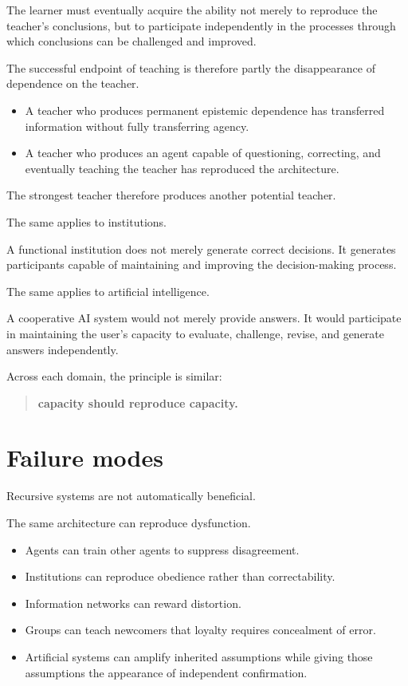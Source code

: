 \documentclass[11pt, a4paper]{article}
\begin{document}
The learner must eventually acquire the ability not merely to reproduce the teacher's conclusions, but to participate independently in the processes through which conclusions can be challenged and improved.

The successful endpoint of teaching is therefore partly the disappearance of dependence on the teacher.

\begin{itemize}[leftmargin=*]
    \item A teacher who produces permanent epistemic dependence has transferred information without fully transferring agency.
    \item A teacher who produces an agent capable of questioning, correcting, and eventually teaching the teacher has reproduced the architecture.
\end{itemize}

The strongest teacher therefore produces another potential teacher.

The same applies to institutions.

A functional institution does not merely generate correct decisions. It generates participants capable of maintaining and improving the decision-making process.

The same applies to artificial intelligence.

A cooperative AI system would not merely provide answers. It would participate in maintaining the user's capacity to evaluate, challenge, revise, and generate answers independently.

Across each domain, the principle is similar:

\begin{quote}
    \textbf{capacity should reproduce capacity.}
\end{quote}

\section{Failure modes}
Recursive systems are not automatically beneficial.

The same architecture can reproduce dysfunction.

\begin{itemize}[leftmargin=*]
    \item Agents can train other agents to suppress disagreement.
    \item Institutions can reproduce obedience rather than correctability.
    \item Information networks can reward distortion.
    \item Groups can teach newcomers that loyalty requires concealment of error.
    \item Artificial systems can amplify inherited assumptions while giving those assumptions the appearance of independent confirmation.
\end{itemize}
\end{document}
